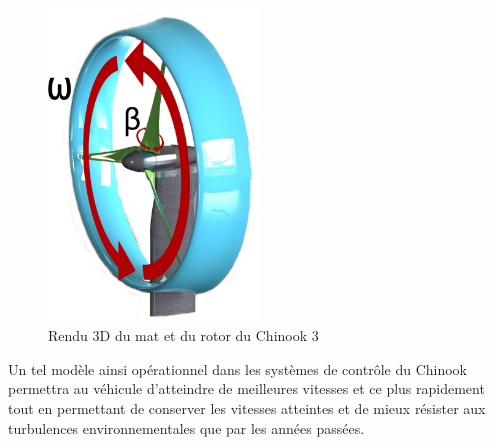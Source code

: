 \begin{figure}[H]
  \label{fig:matRotor}
  \centering
  \includegraphics[width=0.5\textwidth]{images/mat_rotor_annote.jpg}
  \caption[Mat et Rotor du Chinook 3]{Rendu 3D du mat et du rotor du Chinook 3}
\end{figure}

Un tel modèle ainsi opérationnel dans les systèmes de contrôle du Chinook permettra au véhicule d'atteindre de meilleures vitesses et ce plus rapidement tout en permettant de conserver les vitesses atteintes et de mieux résister aux turbulences environnementales que par les années passées.


